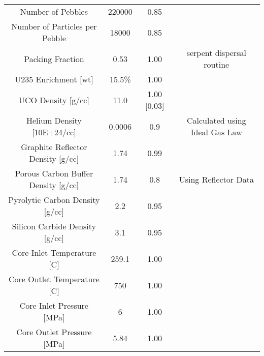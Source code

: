 \documentclass[letterpaper]{article}
\begin{document}
\begin{adjustbox}{max width=\textwidth}
\begin{tabular}{c c c c}
 Number of Pebbles & 220000 & 0.85 &\cite{harlan_x-energy_2018}   \\

 Number of Particles per Pebble & 18000 & 0.85  & \cite{harlan_x-energy_2018}  \\

 Packing Fraction  & 0.53 & 1.00  & serpent dispersal routine  \\

 U235 Enrichment [wt] & 15.5\% & 1.00 & \cite{harlan_ans_2017}  \\

 UCO Density [g/cc] & 11.0 & 1.00 [0.03] & \cite{nagley_fabrication_2010}  \\

 Helium Density [10E+24/cc] &  0.0006 & 0.9  & Calculated using Ideal Gas Law \\

 Graphite Reflector Density [g/cc] & 1.74  & 0.99 & \cite{ho_graphite_1988}  \\

 Porous Carbon Buffer Density [g/cc] & 1.74 & 0.8 & Using Reflector Data  \\

 Pyrolytic Carbon Density [g/cc] & 2.2 & 0.95 & \cite{espi_metals_graphite-pyrolytic_2019}   \\

 Silicon Carbide Density [g/cc] & 3.1 & 0.95 & \cite{accuratus_silicon_2013}  \\

 Core Inlet Temperature [C] & 259.1 & 1.00 & \cite{harlan_x-energy_2018}  \\

 Core Outlet Temperature [C] & 750 & 1.00 & \cite{harlan_x-energy_2018}  \\

 Core Inlet Pressure [MPa] & 6  & 1.00 & \cite{harlan_x-energy_2018}  \\

 Core Outlet Pressure [MPa]  & 5.84 & 1.00 &\cite{harlan_x-energy_2018}   \\




 \end{tabular}
\end{adjustbox}


\end{document}
